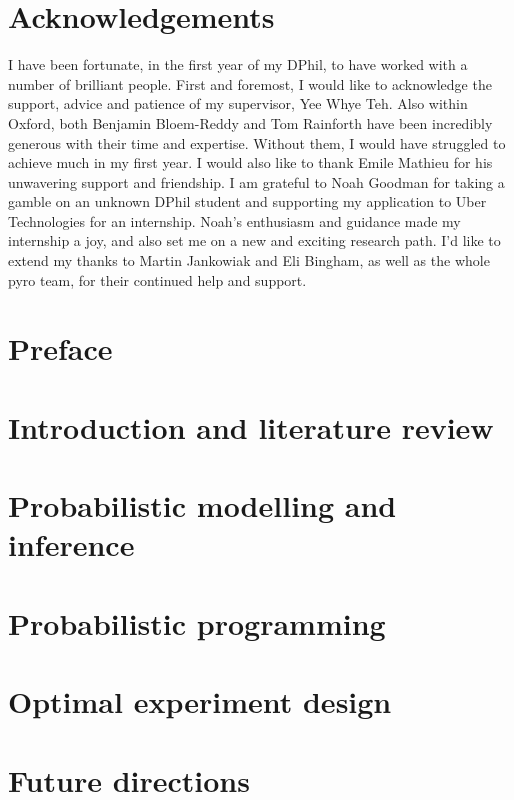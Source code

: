 \documentclass[a4paper, 10pt]{report}
\theoremstyle{plain}
\theoremstyle{definition}
\theoremstyle{remark}
\begin{document}
	
	
	
	\tableofcontents
	
\newpage
	\chapter*{Acknowledgements}
	I have been fortunate, in the first year of my DPhil, to have worked with a number of brilliant people. First and foremost, I would like to acknowledge the support, advice and patience of my supervisor, Yee Whye Teh. Also within Oxford, both Benjamin Bloem-Reddy and Tom Rainforth have been incredibly generous with their time and expertise. Without them, I would have struggled to achieve much in my first year. I would also like to thank Emile Mathieu for his unwavering support and friendship. I am grateful to Noah Goodman for taking a gamble on an unknown DPhil student and supporting my application to Uber Technologies for an internship. Noah's enthusiasm and guidance made my internship a joy, and also set me on a new and exciting research path. I'd like to extend my thanks to Martin Jankowiak and Eli Bingham, as well as the whole pyro team, for their continued help and support.
	
	
	
	\chapter*{Preface}
	\label{chap:preface}
	
	
	\chapter{Introduction and literature review}
	\label{chap:intro}
	
	
	\chapter{Probabilistic modelling and inference}
	\label{chap:probabilistic_modelling}
	
	
	\chapter{Probabilistic programming}
	\label{chap:ppl}
	
	
	\chapter{Optimal experiment design}
	\label{chap:oed}
	
	
	\chapter{Future directions}
	\label{chap:future}
	
	
	
	\clearpage %
	
	
	
	
\end{document}
